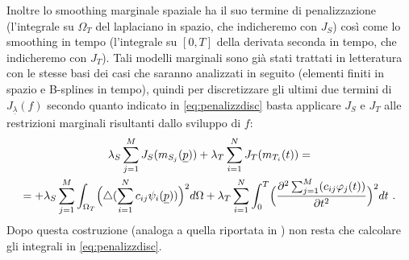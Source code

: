 \documentclass[a4paper,11pt,twoside,openright]{book}							%
\begin{document}
Inoltre lo smoothing marginale spaziale ha il suo termine di penalizzazione (l'integrale su $\Omega_T$ del laplaciano in spazio, che indicheremo con $J_S$) così come lo smoothing in tempo (l'integrale su $[0,T]$ della derivata seconda in tempo, che indicheremo con $J_T$). Tali modelli marginali sono già stati trattati in letteratura con le stesse basi dei casi che saranno analizzati in seguito (elementi finiti in spazio e B-splines in tempo), quindi per discretizzare gli ultimi due termini di $J_{\underline \lambda }(f)$ secondo quanto indicato in \ref{eq:penalizzdisc} basta applicare $J_S$ e $J_T$ alle restrizioni marginali risultanti dallo sviluppo di $f$:
\begin{multline*}
\lambda_S  \sum_{j=1}^M J_S(m_{S_j}(\underline p)) +
\lambda_T \sum_{i=1}^N J_T(m_{T_i}(t)) =\\
=+\lambda_S  \sum_{j=1}^M \int_{\Omega_T} \Bigl( \triangle(\sum_{i=1}^N  c_{ij}\psi_i (\underline p)) \Bigr)^2 d \Omega + \lambda_T \sum_{i=1}^N\int_0^T \Bigl( \frac{\partial^2 \sum_{j=1}^M(c_{ij}\varphi_j(t)) }{\partial t ^2} \Bigr)^2 dt \ .
\end{multline*}
Dopo questa costruzione (analoga a quella riportata in \cite{art:marra}) non resta che calcolare gli integrali in \ref{eq:penalizzdisc}.
\end{document}
